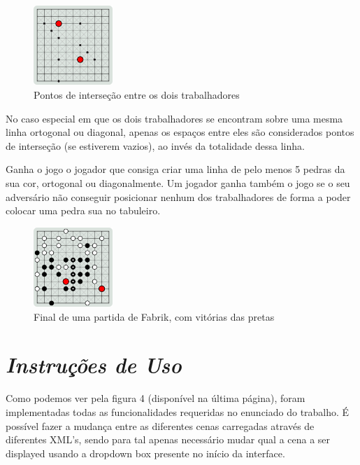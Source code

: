 \documentclass[a4paper]{article}
\begin{document}
\begin{figure}[h!]
\begin{center}
\includegraphics[height=3cm,width=3cm]{images/fabrik_intersection.png}
\caption{Pontos de interseção entre os dois trabalhadores}
\end{center}
\end{figure}

No caso especial em que os dois trabalhadores se encontram sobre uma mesma linha ortogonal ou diagonal, apenas os espaços entre eles são considerados pontos de interseção (se estiverem vazios), ao invés da totalidade dessa linha.

Ganha o jogo o jogador que consiga criar uma linha de pelo menos 5 pedras da sua cor, ortogonal ou diagonalmente. Um jogador ganha também o jogo se o seu adversário não conseguir posicionar nenhum dos trabalhadores de forma a poder colocar uma pedra sua no tabuleiro.

\begin{figure}[h!]
\begin{center}
\includegraphics[height=3cm,width=3cm]{images/fabrik_full_board.png}
\caption{Final de uma partida de Fabrik, com vitórias das pretas}
\end{center}
\end{figure}

\newpage

\section{\textit{Instruções de Uso}}

Como podemos ver pela figura 4 (disponível na última página), foram implementadas todas as funcionalidades requeridas no enunciado do trabalho. É possível fazer a mudança entre as diferentes cenas carregadas através de diferentes XML’s, sendo para tal apenas necessário mudar qual a cena a ser displayed usando a dropdown box presente no início da interface.
\end{document}
